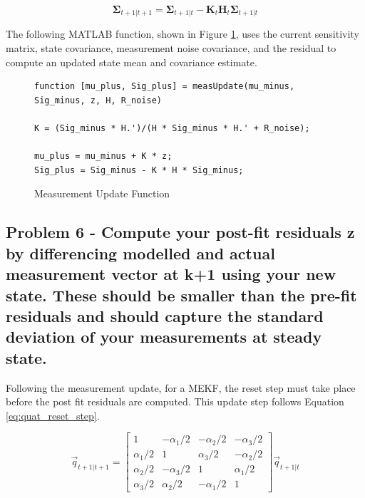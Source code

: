 \begin{equation} \label{eq:state_covariance_update}
    \boldsymbol{\Sigma}_{t+1 \vert t+1} = \boldsymbol{\Sigma}_{t+1 \vert t} - \boldsymbol{K}_t \boldsymbol{H}_t \boldsymbol{\Sigma}_{t+1 \vert t}
\end{equation}

The following MATLAB function, shown in Figure \ref{fig:meas_update_matlab_func}, uses the current sensitivity matrix, state covariance, measurement noise covariance, and the residual to compute an updated state mean and covariance estimate.

\begin{figure}
    \centering
    \captionsetup{ justification = centering}
    \begin{lstlisting}
function [mu_plus, Sig_plus] = measUpdate(mu_minus, Sig_minus, z, H, R_noise)

K = (Sig_minus * H.')/(H * Sig_minus * H.' + R_noise);

mu_plus = mu_minus + K * z;
Sig_plus = Sig_minus - K * H * Sig_minus;
    \end{lstlisting}
    \caption{Measurement Update Function}
    \label{fig:meas_update_matlab_func}
\end{figure}

\subsection{Problem 6 - Compute your post-fit residuals z by differencing modelled and actual measurement vector at k+1 using your new state. These should be smaller than the pre-fit residuals and should capture the standard deviation of your measurements at steady state.}

Following the measurement update, for a MEKF, the reset step must take place before the post fit residuals are computed. This update step follows Equation \ref{eq:quat_reset_step}.

\begin{equation} \label{eq:quat_reset_step}
    \vec{q}_{t+1 \vert t+1} = \begin{bmatrix}
        1 & -\alpha_1/2 & -\alpha_2/2 & -\alpha_3/2 \\
        \alpha_1/2 & 1 & \alpha_3/2 & -\alpha_2/2 \\
        \alpha_2/2 & -\alpha_3/2 & 1 & \alpha_1/2 \\
        \alpha_3/2 & \alpha_2/2 & -\alpha_1/2 & 1
    \end{bmatrix} \vec{q}_{t+1 \vert t}
\end{equation}

